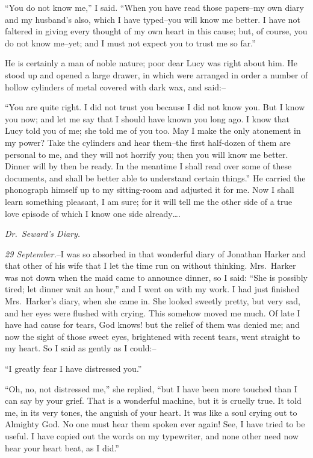 \documentclass[12pt,openright]{book}
\begin{document}
“You do not know me,” I said. “When you have read those papers–my own diary and my husband’s also, which I have typed–you will know me better. I have not faltered in giving every thought of my own heart in this cause; but, of course, you do not know me–yet; and I must not expect you to trust me so far.”

He is certainly a man of noble nature; poor dear Lucy was right about him. He stood up and opened a large drawer, in which were arranged in order a number of hollow cylinders of metal covered with dark wax, and said:–

“You are quite right. I did not trust you because I did not know you. But I know you now; and let me say that I should have known you long ago. I know that Lucy told you of me; she told me of you too. May I make the only atonement in my power? Take the cylinders and hear them–the first half-dozen of them are personal to me, and they will not horrify you; then you will know me better. Dinner will by then be ready. In the meantime I shall read over some of these documents, and shall be better able to understand certain things.” He carried the phonograph himself up to my sitting-room and adjusted it for me. Now I shall learn something pleasant, I am sure; for it will tell me the other side of a true love episode of which I know one side already….

\textit{Dr. Seward’s Diary.}

\textit{29 September.}–I was so absorbed in that wonderful diary of Jonathan Harker and that other of his wife that I let the time run on without thinking. Mrs. Harker was not down when the maid came to announce dinner, so I said: “She is possibly tired; let dinner wait an hour,” and I went on with my work. I had just finished Mrs. Harker’s diary, when she came in. She looked sweetly pretty, but very sad, and her eyes were flushed with crying. This somehow moved me much. Of late I have had cause for tears, God knows! but the relief of them was denied me; and now the sight of those sweet eyes, brightened with recent tears, went straight to my heart. So I said as gently as I could:–

“I greatly fear I have distressed you.”

“Oh, no, not distressed me,” she replied, “but I have been more touched than I can say by your grief. That is a wonderful machine, but it is cruelly true. It told me, in its very tones, the anguish of your heart. It was like a soul crying out to Almighty God. No one must hear them spoken ever again! See, I have tried to be useful. I have copied out the words on my typewriter, and none other need now hear your heart beat, as I did.”
\end{document}
